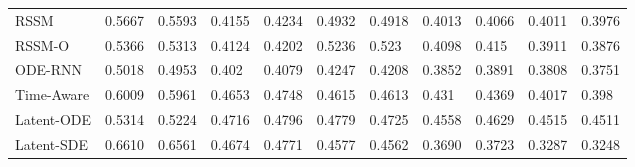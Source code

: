 \begin{table}
{\begin{tabular}{l|ll|ll|ll|ll|ll}
        RSSM                  & 0.5667 & 0.5593                   & 0.4155 & 0.4234                 & 0.4932 & 0.4918                   & 0.4013 & 0.4066                 & 0.4011 & 0.3976            \\
        RSSM-O                & 0.5366 & 0.5313                   & 0.4124 & 0.4202                 & 0.5236 & 0.523                    & 0.4098 & 0.415                  & 0.3911 & 0.3876            \\ 
        \hline
        ODE-RNN               & \cellcolor{Green!30} 0.5018 & \cellcolor{Green!30} 0.4953                   & \cellcolor{Green!60} 0.402  & \cellcolor{Green!60} 0.4079                 & \cellcolor{Green!30} 0.4247 & \cellcolor{Green!30} 0.4208                   & 0.3852 & 0.3891                 & 0.3808 & 0.3751            \\
        Time-Aware            & 0.6009	&   0.5961                   & 0.4653	&   0.4748                 & 0.4615	&   0.4613                    & 0.431	&   0.4369                 & 0.4017	&   0.398            \\
        \hline
        Latent-ODE            & 0.5314 & 0.5224 & 0.4716 & 0.4796  & 0.4779 & 0.4725 & 0.4558 & 0.4629  & 0.4515 & 0.4511            
             \\
        Latent-SDE       & 0.6610	&   0.6561                   & 0.4674	&   0.4771                 & 0.4577	&   0.4562                    & \cellcolor{Green!30} 0.3690	&   \cellcolor{Green!60} 0.3723               & \cellcolor{Green!60} 0.3287	&   \cellcolor{Green!60} 0.3248    
             \\    
        

\end{tabular}}
\end{table}
